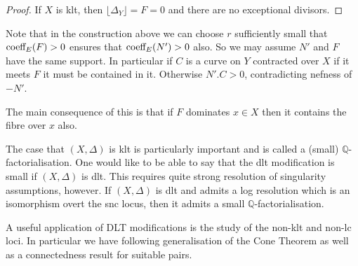 \begin{proof}
	If $X$ is klt, then $\lfloor\Delta_{Y}\rfloor=F=0$ and there are no exceptional divisors.
\end{proof}


\begin{remark}\label{lc-connect}
	Note that in the construction above we can choose $r$ sufficiently small that $\textup{coeff}_{E}(F) > 0$ ensures that $\textup{coeff}_{E}(N') > 0$ also. So we may assume $N'$ and $F$ have the same support. In particular if $C$ is a curve on $Y$ contracted over $X$ if it meets $F$ it must be contained in it. Otherwise $N'.C >0$, contradicting nefness of $-N'$.
	
	The main consequence of this is that if $F$ dominates $x \in X$ then it contains the fibre over $x$ also.
	\end{remark}

The case that $(X,\Delta)$ is klt is particularly important and is called a (small) $\mathbb{Q}$-factorialisation. One would like to be able to say that the dlt modification is small if $(X,\Delta)$ is dlt. This requires quite strong resolution of singularity assumptions, however. If $(X,\Delta)$ is dlt and admits a log resolution which is an isomorphism overt the snc locus, then it admits a small $\mathbb{Q}$-factorialisation.

A useful application of DLT modifications is the study of the non-klt and non-lc loci. In particular we have following generalisation of the Cone Theorem as well as a connectedness result for suitable pairs.


